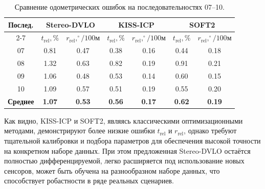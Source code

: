 \begin{table}[h]
  \caption{Сравнение одометрических ошибок на последовательностях 07–10.}
  \label{tab:kiss_soft2}
  \centering
  \begin{tabular}{|c|cc|cc|cc|}
    \hline
    \multirow{2}{*}{Послед.} &
    \multicolumn{2}{c|}{Stereo-DVLO} &
    \multicolumn{2}{c|}{KISS-ICP} &
    \multicolumn{2}{c|}{SOFT2} \\ \cline{2-7}
    & $t_{\mathrm{rel}}, \%$ & $r_{\mathrm{rel}},^\circ/100$м
    & $t_{\mathrm{rel}}, \%$ & $r_{\mathrm{rel}},^\circ/100$м
    & $t_{\mathrm{rel}}, \%$ & $r_{\mathrm{rel}},^\circ/100$м \\ \hline
    07 & 0.81 & 0.47 & 0.38 & 0.16 & 0.44 & 0.18 \\
    08 & 1.32 & 0.63 & 0.82 & 0.19 & 0.91 & 0.21 \\
    09 & 1.06 & 0.48 & 0.53 & 0.14 & 0.60 & 0.15 \\
    10 & 1.09 & 0.57 & 0.51 & 0.19 & 0.55 & 0.20 \\ \hline
    \textbf{Среднее} &
    \textbf{1.07} & \textbf{0.53} &
    \textbf{0.56} & \textbf{0.17} &
    \textbf{0.62} & \textbf{0.19} \\ \hline
  \end{tabular}
\end{table}

Как видно, KISS-ICP и SOFT2,
являясь классическими оптимизационными методами,
демонстрируют более низкие ошибки
$t_{\mathrm{rel}}$ и $r_{\mathrm{rel}}$, однако требуют тщательной калибровки и 
подбора параметров для обеспечения высокой точности на конкретном наборе данных.
При этом предложенная Stereo-DVLO остаётся полностью дифференцируемой,
легко расширяется под использование новых сенсоров, может быть обучена на 
разнообразном наборе данных, что способствует робастности в ряде реальных сценариев.
